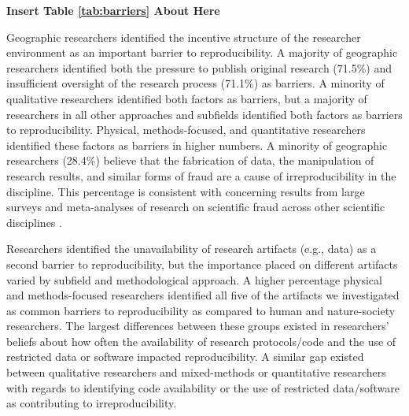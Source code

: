 \documentclass[]{interact}
\newcommand{\citep}{\parencite}
\theoremstyle{plain}%
\theoremstyle{definition}
\theoremstyle{remark}
\begin{document}
\begin{center}
\textbf{Insert Table \ref{tab:barriers} About Here}
\end{center}

Geographic researchers identified the incentive structure of the researcher environment as an important barrier to reproducibility.
A majority of geographic researchers identified both the pressure to publish original research (71.5\%) and insufficient oversight of the research process (71.1\%) as barriers.
A minority of qualitative researchers identified both factors as barriers, but a majority of researchers in all other approaches and subfields identified both factors as barriers to reproducibility.
Physical, methods-focused, and quantitative researchers identified these factors as barriers in higher numbers. 
A minority of geographic researchers (28.4\%) believe that the fabrication of data, the manipulation of research results, and similar forms of fraud are a cause of irreproducibility in the discipline.
This percentage is consistent with concerning results from large surveys and meta-analyses of research on scientific fraud across other scientific disciplines \citep{fanelli2009many, baker20161}.

Researchers identified the unavailability of research artifacts (e.g., data) as a second barrier to reproducibility, but the importance placed on different artifacts varied by subfield and methodological approach.
A higher percentage physical and methods-focused researchers identified all five of the artifacts we investigated as common barriers to reproducibility as compared to human and nature-society researchers.
The largest differences between these groups existed in researchers' beliefs about how often the availability of research protocols/code and the use of restricted data or software impacted reproducibility.
A similar gap existed between qualitative researchers and mixed-methods or quantitative researchers with regards to identifying code availability or the use of restricted data/software as contributing to irreproducibility.
\end{document}

